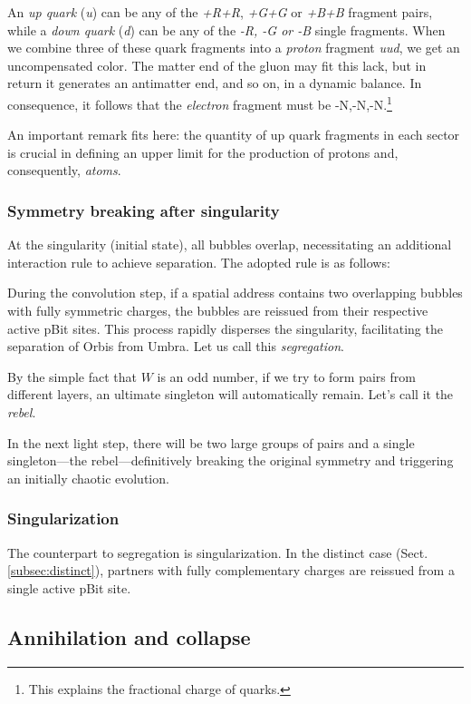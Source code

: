 \documentclass[12pt,english]{article}
\begin{document}
An \emph{up quark} (\emph{u}) can be any of the \emph{+R+R}, \emph{+G+G} or \emph{+B+B} fragment pairs, while a \emph{down quark} (\emph{d}) can be any of the \emph{-R, -G or -B }single fragments. When we combine three of these quark fragments into a \emph{proton} fragment \emph{uud}, we get an uncompensated color. The matter end of the gluon may fit this lack, but in return it generates an antimatter end, and so on, in a dynamic balance. In consequence, it follows that the \emph{electron} fragment must be -N,-N,-N.\footnote{This explains the fractional charge of quarks.} 

An important remark fits here: the quantity of up quark fragments in each sector is crucial in defining an upper limit for the production of protons and, consequently, \textit{atoms}.

\subsubsection{Symmetry breaking after singularity}

At the singularity (initial state), all bubbles overlap, necessitating an additional interaction rule to achieve separation. The adopted rule is as follows:

During the convolution step, if a spatial address contains two overlapping bubbles with fully symmetric charges, the bubbles are reissued from their respective active pBit sites. This process rapidly disperses the singularity, facilitating the separation of Orbis from Umbra. Let us call this \textit{segregation}.

By the simple fact that $W$ is an odd number, if we try to form pairs from different layers, an ultimate singleton will automatically remain. Let's call it the \textit{rebel}.

In the next light step, there will be two large groups of pairs and a single singleton—the rebel—definitively breaking the original symmetry and triggering an initially chaotic evolution.

\subsubsection{Singularization}
The counterpart to segregation is singularization. In the distinct case (Sect. \ref{subsec:distinct}), partners with fully complementary charges are reissued from a single active pBit site.

\subsection{Annihilation and collapse}
\end{document}
